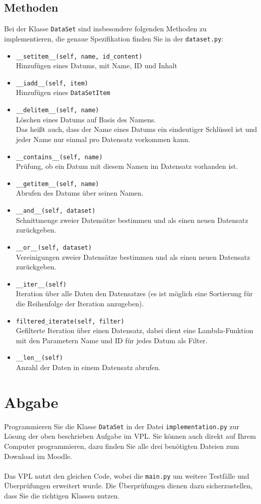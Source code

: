 \documentclass[10pt, a4paper, parskip=full]{article}
\begin{document}
\subsection{Methoden}
Bei der Klasse \lstinline{DataSet} sind insbesondere folgenden Methoden zu implementieren, die genaue Spezifikation finden Sie in der \lstinline{dataset.py}:
\begin{itemize}
\item \lstinline{__setitem__(self, name, id_content)}\\
 Hinzufügen eines Datums, mit Name, ID und Inhalt
\item \lstinline{__iadd__(self, item)}\\
 Hinzufügen eines \lstinline{DataSetItem}
\item \lstinline{__delitem__(self, name)}\\
 Löschen eines Datums auf Basis des Namens.\\
 Das heißt auch, dass der Name eines Datums ein eindeutiger Schlüssel ist und jeder Name nur einmal pro Datensatz vorkommen kann.
\item \lstinline{__contains__(self, name)}\\
 Prüfung, ob ein Datum mit diesem Namen im Datensatz vorhanden ist.
\item \lstinline{__getitem__(self, name)}\\
 Abrufen des Datums über seinen Namen. 
\item \lstinline{__and__(self, dataset)}\\
 Schnittmenge zweier Datensätze bestimmen und als einen neuen Datensatz zurückgeben.
\item \lstinline{__or__(self, dataset)}\\
 Vereinigungen zweier Datensätze bestimmen und als einen neuen Datensatz zurückgeben.
\item \lstinline{__iter__(self)}\\
 Iteration über alle Daten den Datensatzes (es ist möglich eine Sortierung für die Reihenfolge der Iteration anzugeben).
\item \lstinline{filtered_iterate(self, filter)}\\
 Gefilterte Iteration über einen Datensatz, dabei dient eine Lambda-Funktion mit den Parametern Name und ID für jedes Datum als Filter.
\item \lstinline{__len__(self)}\\
 Anzahl der Daten in einem Datensatz abrufen.
\end{itemize}

\section{Abgabe}
Programmieren Sie die Klasse \lstinline{DataSet} in der Datei \lstinline{implementation.py} zur Lösung der oben beschrieben Aufgabe im VPL.
Sie können auch direkt auf Ihrem Computer programmieren, dazu finden Sie alle drei benötigten Dateien zum Download im Moodle.\\
\\
Das VPL nutzt den gleichen Code, wobei die \lstinline{main.py} um weitere Testfälle und Überprüfungen erweitert wurde.
Die Überprüfungen dienen dazu sicherzustellen, dass Sie die richtigen Klassen nutzen.\\
\end{document}
